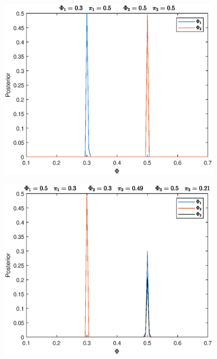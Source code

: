 \documentclass[a4paper,12pt,twoside,titlepage,openright]{book}
\begin{document}
		\begin{figure}
			\centering
			\includegraphics{validation/1param2.eps}
			\caption{}
			\label{val: 1param2}
		\end{figure}
		\begin{figure}
			\centering
			\includegraphics{validation/1param3.eps}
			\caption{}
			\label{val: 1param3}
		\end{figure}
\end{document}
